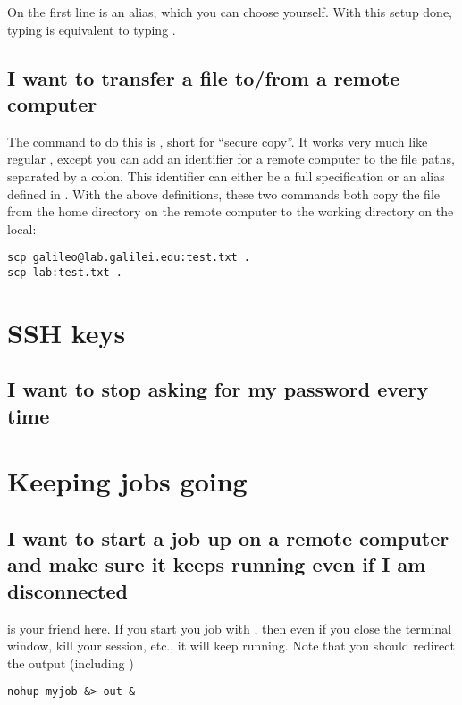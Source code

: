 On the first line  is an alias, which you can choose yourself. With
this setup done, typing  is equivalent to typing .

\subsection{I want to transfer a file to/from a remote computer}

The command to do this is , short for ``secure copy''. It works very
much like regular , except you can add an identifier for a remote
computer to the file paths, separated by a colon. This identifier can either be
a full  specification or an alias defined in
. With the above definitions, these two commands both copy the
file  from the home directory on the remote computer to the
working directory on the local:

\begin{lstlisting}
scp galileo@lab.galilei.edu:test.txt .
scp lab:test.txt .
\end{lstlisting}

\section{SSH keys}

\subsection{I want to stop  asking for my password every time}


\section{Keeping jobs going}

\subsection{I want to start a job up on a remote computer and make sure it
keeps running even if I am disconnected}

 is your friend here. If you start you job with , then
even if you close the terminal window, kill your  session, etc., it
will keep running. Note that you should redirect the output (including
)

\begin{lstlisting}
nohup myjob &> out &
\end{lstlisting}

